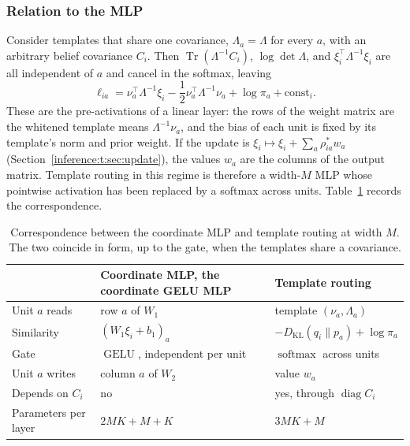 \documentclass[11pt]{article}
\theoremstyle{definition}
\theoremstyle{remark}
\providecommand{\KL}{D_{\mathrm{KL}}}
\providecommand{\softmax}{\operatorname{softmax}}
\providecommand{\Tr}{\operatorname{Tr}}
\providecommand{\diag}{\operatorname{diag}}
\begin{document}
\subsubsection{Relation to the MLP}

Consider templates that share one covariance, $\Lambda_a=\Lambda$ for every $a$, with an arbitrary belief covariance $C_i$. Then $\Tr(\Lambda^{-1}C_i)$, $\log\det\Lambda$, and $\xi_i^{\top}\Lambda^{-1}\xi_i$ are all independent of $a$ and cancel in the softmax, leaving
\begin{equation}
\ell_{ia}=\nu_a^{\top}\Lambda^{-1}\xi_i-\frac12\nu_a^{\top}\Lambda^{-1}\nu_a+\log\pi_a+\text{const}_i.
\label{inference:t:eq:affine_logits}
\end{equation}
These are the pre-activations of a linear layer: the rows of the weight matrix are the whitened template means $\Lambda^{-1}\nu_a$, and the bias of each unit is fixed by its template's norm and prior weight. If the update is $\xi_i\mapsto\xi_i+\sum_a\rho^{*}_{ia}w_a$ (Section~\ref{inference:t:sec:update}), the values $w_a$ are the columns of the output matrix. Template routing in this regime is therefore a width-$M$ MLP whose pointwise activation has been replaced by a softmax across units. Table~\ref{inference:t:tab:correspondence} records the correspondence.

\begin{table}[h]
\centering
\begin{tabular}{@{}lll@{}}
\toprule
 & Coordinate MLP, the coordinate GELU MLP & Template routing \\
\midrule
Unit $a$ reads & row $a$ of $W_1$ & template $(\nu_a,\Lambda_a)$ \\
Similarity & $(W_1\xi_i+b_1)_a$ & $-\KL(q_i\|p_a)+\log\pi_a$ \\
Gate & $\operatorname{GELU}$, independent per unit & $\softmax$ across units \\
Unit $a$ writes & column $a$ of $W_2$ & value $w_a$ \\
Depends on $C_i$ & no & yes, through $\diag C_i$ \\
Parameters per layer & $2MK+M+K$ & $3MK+M$ \\
\bottomrule
\end{tabular}
\caption{Correspondence between the coordinate MLP and template routing at width $M$. The two coincide in form, up to the gate, when the templates share a covariance.}
\label{inference:t:tab:correspondence}
\end{table}
\end{document}
